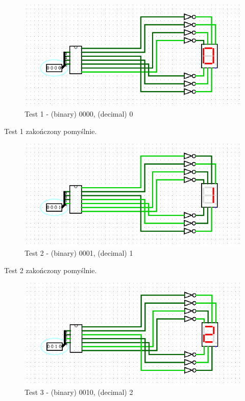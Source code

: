 \begin{figure}[h]
    \includegraphics[width=\linewidth]{ScreenshotsTests/Comp 1/Comp 1_00009.png}
    \caption{Test 1 - (binary) 0000, (decimal) 0}
    \label{fig:test0}
\end{figure}

Test 1 zakończony pomyślnie.

\begin{figure}[H]
    \includegraphics[width=\linewidth]{ScreenshotsTests/Comp 1/Comp 1_00008.png}
    \caption{Test 2 - (binary) 0001, (decimal) 1}
    \label{fig:test1}
\end{figure}

Test 2 zakończony pomyślnie.

\begin{figure}[H]
    \includegraphics[width=\linewidth]{ScreenshotsTests/Comp 1/Comp 1_00007.png}
    \caption{Test 3 - (binary) 0010, (decimal) 2}
    \label{fig:test2}
\end{figure}

